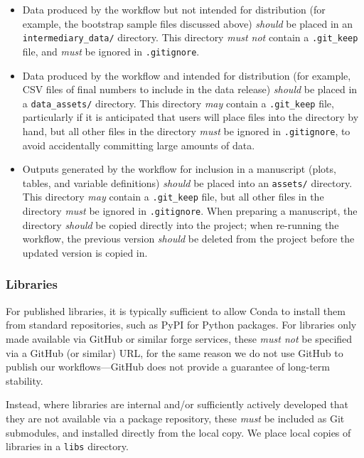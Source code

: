 \documentclass{article}
\newcommand\rfcword[1]{\emph{#1}\xspace}
\newcommand\must{\rfcword{must}}
\newcommand\mustnot{\rfcword{must not}}
\newcommand\should{\rfcword{should}}
\newcommand\may{\rfcword{may}}
\newcommand\filename[1]{\texttt{#1}\xspace}
\begin{document}
\begin{itemize}
  \item
        Data produced by the workflow but not intended for distribution
        (for example,
        the bootstrap sample files discussed above)
        \should be placed in an \filename{intermediary\_data/} directory.
        This directory \mustnot contain a \filename{.git\_keep} file,
        and \must be ignored in \filename{.gitignore}.
  \item
        Data produced by the workflow and intended for distribution
        (for example,
        CSV files of final numbers to include in the data release)
        \should be placed in a \filename{data\_assets/} directory.
        This directory \may contain a \filename{.git\_keep} file,
        particularly if it is anticipated that users will place files into the directory by hand,
        but all other files in the directory \must be ignored in \filename{.gitignore},
        to avoid accidentally committing large amounts of data.
  \item
        Outputs generated by the workflow for inclusion in a manuscript
        (plots, tables, and variable definitions)
        \should be placed into an \filename{assets/} directory.
        This directory \may contain a \filename{.git\_keep} file,
        but all other files in the directory \must be ignored in \filename{.gitignore}.
        When preparing a manuscript,
        the directory \should be copied directly into the project;
        when re-running the workflow,
        the previous version \should be deleted from the project
        before the updated version is copied in.
\end{itemize}


\subsubsection{Libraries}

For published libraries,
it is typically sufficient to allow Conda to install them from standard repositories,
such as PyPI for Python packages.
For libraries only made available via GitHub or similar forge services,
these \mustnot be specified via a GitHub
(or similar)
URL,
for the same reason we do not use GitHub to publish our workflows---GitHub
does not provide a guarantee of long-term stability.

Instead,
where libraries are internal and/or sufficiently actively developed that
they are not available via a package repository,
these \must be included as Git submodules,
and installed directly from the local copy.
We place local copies of libraries in a \filename{libs} directory.
\end{document}
